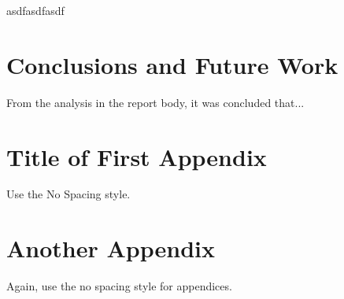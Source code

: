 \documentclass{ece}
\begin{document}
asdfasdfasdf

\section{Conclusions and Future Work}

From the analysis in the report body, it was concluded that...


\printbibliography[heading=none]


\appendix

\section{Title of First Appendix}
\label{app:firstappx}
Use the No Spacing style.

\section{Another Appendix}
\label{app:anotherappx}
Again, use the no spacing style for appendices.
\end{document}
